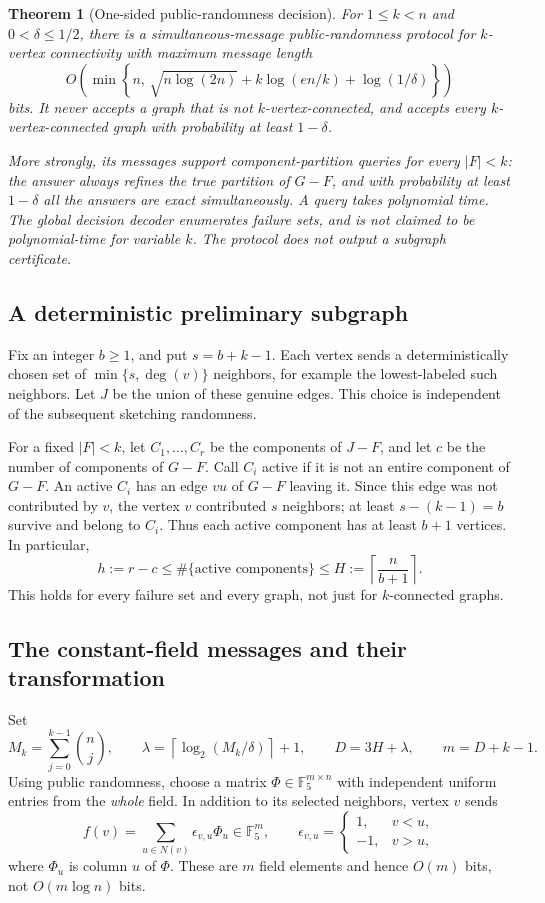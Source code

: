 \documentclass[11pt]{article}
\newtheorem{theorem}{Theorem}[section]
\theoremstyle{remark}\newtheorem{remark}[theorem]{Remark}
\newcommand{\F}{\mathbb F}
\begin{document}
\begin{theorem}[One-sided public-randomness decision]\label{thm:constant-rank}
For $1\le k<n$ and $0<\delta\le1/2$, there is a simultaneous-message public-randomness protocol for $k$-vertex connectivity with maximum message length
\[
 O\!\left(\min\left\{n,\,
 \sqrt{n\log(2n)}+k\log(en/k)+\log(1/\delta)\right\}\right)
\]
bits. It never accepts a graph that is not $k$-vertex-connected, and accepts every $k$-vertex-connected graph with probability at least $1-\delta$.

More strongly, its messages support component-partition queries for every $|F|<k$: the answer always refines the true partition of $G-F$, and with probability at least $1-\delta$ all the answers are exact simultaneously. A query takes polynomial time. The global decision decoder enumerates failure sets, and is \emph{not claimed to be polynomial-time for variable $k$}. The protocol does not output a subgraph certificate.
\end{theorem}

\subsection{A deterministic preliminary subgraph}
Fix an integer $b\ge1$, and put $s=b+k-1$. Each vertex sends a deterministically chosen set of $\min\{s,\deg(v)\}$ neighbors, for example the lowest-labeled such neighbors. Let $J$ be the union of these genuine edges. This choice is independent of the subsequent sketching randomness.

For a fixed $|F|<k$, let $C_1,\ldots,C_r$ be the components of $J-F$, and let $c$ be the number of components of $G-F$. Call $C_i$ active if it is not an entire component of $G-F$. An active $C_i$ has an edge $vu$ of $G-F$ leaving it. Since this edge was not contributed by $v$, the vertex $v$ contributed $s$ neighbors; at least $s-(k-1)=b$ survive and belong to $C_i$. Thus each active component has at least $b+1$ vertices. In particular,
\begin{equation}\label{eq:rank-budget}
 h:=r-c\le \#\{\text{active components}\}\le H:=\left\lceil\frac{n}{b+1}\right\rceil.
\end{equation}
This holds for every failure set and every graph, not just for $k$-connected graphs.

\subsection{The constant-field messages and their transformation}
Set
\[
 M_k=\sum_{j=0}^{k-1}\binom nj,\qquad
 \lambda=\left\lceil\log_2(M_k/\delta)\right\rceil+1,\qquad
 D=3H+\lambda,\qquad m=D+k-1.
\]
Using public randomness, choose a matrix $\Phi\in\F_5^{m\times n}$ with independent uniform entries from the \emph{whole} field. In addition to its selected neighbors, vertex $v$ sends
\[
 f(v)=\sum_{u\in N(v)}\epsilon_{v,u}\Phi_u\in\F_5^m,
 \qquad
 \epsilon_{v,u}=\begin{cases}1,&v<u,\\-1,&v>u,\end{cases}
\]
where $\Phi_u$ is column $u$ of $\Phi$. These are $m$ field elements and hence $O(m)$ bits, not $O(m\log n)$ bits.
\end{document}
